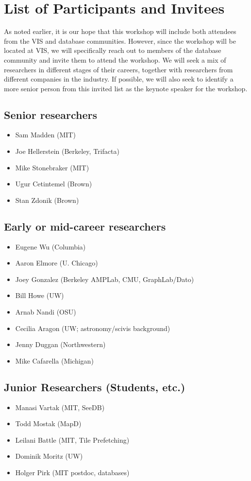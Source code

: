 \documentclass[journal]{vgtc}                %
\begin{document}
\section{List of Participants and Invitees}
\label{sec:invitees}

As noted earlier, it is our hope that this workshop will include both
attendees from the VIS and database communities. However, since the
workshop will be located at VIS, we will specifically reach out to
members of the database community and invite them to attend the
workshop. We will seek a mix of researchers in different stages of
their careers, together with researchers from different companies in
the industry. If possible, we will also seek to identify a more senior
person from this invited list as the keynote speaker for the workshop.

\subsection*{Senior researchers}
\begin{itemize}[topsep=0pt, partopsep=0pt, itemsep=-3pt]
\item Sam Madden (MIT)
\item Joe Hellerstein (Berkeley, Trifacta)
\item Mike Stonebraker (MIT)
\item Ugur Cetintemel (Brown)
\item Stan Zdonik (Brown)
\end{itemize}

\subsection*{Early or mid-career researchers}
\begin{itemize}[topsep=0pt, partopsep=0pt, itemsep=-3pt]
\item Eugene Wu (Columbia)
\item Aaron Elmore (U. Chicago)
\item Joey Gonzalez (Berkeley AMPLab, CMU, GraphLab/Dato)
\item Bill Howe (UW)
\item Arnab Nandi (OSU)
\item Cecilia Aragon (UW; astronomy/scivis background)
\item Jenny Duggan (Northwestern)
\item Mike Cafarella (Michigan)
\end{itemize}

\subsection*{Junior Researchers (Students, etc.)}
\begin{itemize}[topsep=0pt, partopsep=0pt, itemsep=-3pt]
\item Manasi Vartak (MIT, SeeDB)
\item Todd Mostak (MapD)
\item Leilani Battle (MIT, Tile Prefetching)
\item Dominik Moritz (UW)
\item Holger Pirk (MIT postdoc, databases)
\end{itemize}
\end{document}
